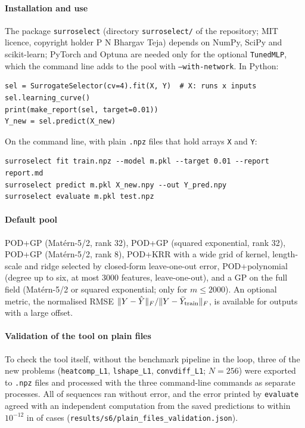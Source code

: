 \paragraph{Installation and use} The package \texttt{surroselect} (directory \texttt{surroselect/} of the repository; MIT licence, copyright holder P N Bhargav Teja) depends on NumPy, SciPy and scikit-learn; PyTorch and Optuna are needed only for the optional \texttt{TunedMLP}, which the command line adds to the pool with \texttt{--with-network}. In Python:
{\footnotesize\begin{verbatim}
sel = SurrogateSelector(cv=4).fit(X, Y)  # X: runs x inputs
sel.learning_curve()
print(make_report(sel, target=0.01))
Y_new = sel.predict(X_new)
\end{verbatim}}
On the command line, with plain \texttt{.npz} files that hold arrays \texttt{X} and \texttt{Y}:
{\footnotesize\begin{verbatim}
surroselect fit train.npz --model m.pkl --target 0.01 --report report.md
surroselect predict m.pkl X_new.npy --out Y_pred.npy
surroselect evaluate m.pkl test.npz
\end{verbatim}}
\paragraph{Default pool} POD+GP (Mat\'ern-5/2, rank 32), POD+GP (squared exponential, rank 32), POD+GP (Mat\'ern-5/2, rank 8), POD+KRR with a wide grid of kernel, length-scale and ridge selected by closed-form leave-one-out error, POD+polynomial (degree up to six, at most 3000 features, leave-one-out), and a GP on the full field (Mat\'ern-5/2 or squared exponential; only for $m\le2000$). An optional metric, the normalised RMSE $\lVert Y-\hat Y\rVert_F/\lVert Y-\bar Y_{\rm train}\rVert_F$, is available for outputs with a large offset.
\paragraph{Validation of the tool on plain files} To check the tool itself, without the benchmark pipeline in the loop, three of the new problems (\texttt{heatcomp\_L1}, \texttt{lshape\_L1}, \texttt{convdiff\_L1}; $N=256$) were exported to \texttt{.npz} files and processed with the three command-line commands as separate processes. All \PlainOk{} of \PlainN{} sequences ran without error, and the error printed by \texttt{evaluate} agreed with an independent computation from the saved predictions to within $10^{-12}$ in \PlainAgree{} of \PlainN{} cases (\texttt{results/s6/plain\_files\_validation.json}).
